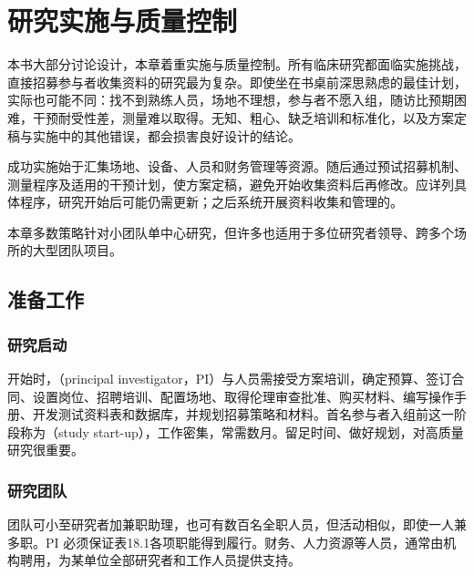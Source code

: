 \chapter{研究实施与质量控制}
本书大部分讨论设计，本章着重实施与质量控制。所有临床研究都面临实施挑战，直接招募参与者收集资料的研究最为复杂。即使坐在书桌前深思熟虑的最佳计划，实际也可能不同：找不到熟练人员，场地不理想，参与者不愿入组，随访比预期困难，干预耐受性差，测量难以取得。无知、粗心、缺乏培训和标准化，以及方案定稿与实施中的其他错误，都会损害良好设计的结论。

成功实施始于汇集场地、设备、人员和财务管理等资源。随后通过预试招募机制、测量程序及适用的干预计划，使方案定稿，避免开始收集资料后再修改。应详列具体程序，研究开始后可能仍需更新；之后系统开展资料收集和管理的。

本章多数策略针对小团队单中心研究，但许多也适用于多位研究者领导、跨多个场所的大型团队项目。

\section{准备工作}
\subsection{研究启动}
开始时，（principal investigator，PI）与人员需接受方案培训，确定预算、签订合同、设置岗位、招聘培训、配置场地、取得伦理审查批准、购买材料、编写操作手册、开发测试资料表和数据库，并规划招募策略和材料。首名参与者入组前这一阶段称为（study start-up），工作密集，常需数月。留足时间、做好规划，对高质量研究很重要。

\subsection{研究团队}
团队可小至研究者加兼职助理，也可有数百名全职人员，但活动相似，即使一人兼多职。PI 必须保证表18.1各项职能得到履行。财务、人力资源等人员，通常由机构聘用，为某单位全部研究者和工作人员提供支持。

